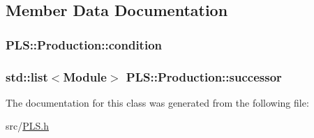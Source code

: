 \subsection{Member Data Documentation}
\subsubsection[{\texorpdfstring{condition}{condition}}]{ P\+L\+S\+::\+Production\+::condition}\hypertarget{class_p_l_s_1_1_production_a4716e3e4a5977d055478f6f40dcd87d5}{}\label{class_p_l_s_1_1_production_a4716e3e4a5977d055478f6f40dcd87d5}
\subsubsection[{\texorpdfstring{successor}{successor}}]{\setlength{\rightskip}{0pt plus 5cm}std\+::list$<${\bf Module}$>$ P\+L\+S\+::\+Production\+::successor}\hypertarget{class_p_l_s_1_1_production_ac5611c64151bab5119aa2ad23fb46039}{}\label{class_p_l_s_1_1_production_ac5611c64151bab5119aa2ad23fb46039}


The documentation for this class was generated from the following file\+:\begin{DoxyCompactItemize}
\item 
src/\hyperlink{_p_l_s_8h}{P\+L\+S.\+h}\end{DoxyCompactItemize}
